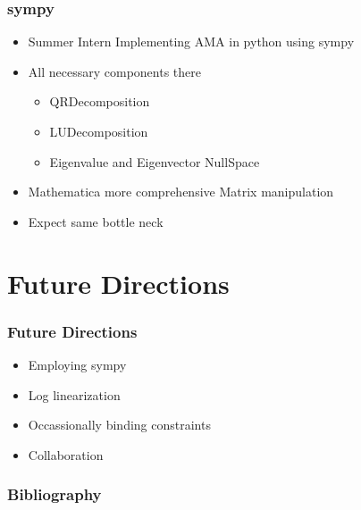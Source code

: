 \documentclass[tikz]{beamer}
\begin{document}
\begin{frame}
  \frametitle{sympy}
  
  \begin{itemize}
  \item Summer Intern Implementing AMA in python using sympy
  \item All necessary components there
    \begin{itemize}
    \item QRDecomposition
    \item LUDecomposition
    \item Eigenvalue and Eigenvector  NullSpace
    \end{itemize}
  \item Mathematica more comprehensive Matrix manipulation
  \item Expect same bottle neck
  \end{itemize}
\end{frame}



\section{Future Directions}

\begin{frame}
  \frametitle{Future Directions}
  \begin{itemize}
  \item Employing sympy
 \item Log linearization 
\item Occassionally binding constraints
\item Collaboration %
  \end{itemize}
\end{frame}

\begin{frame}
  \frametitle{Bibliography}
  


\end{frame}


\end{document}
